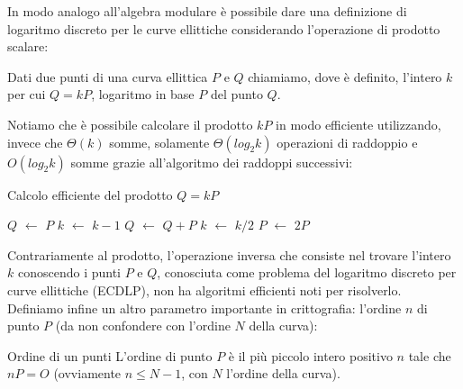 \documentclass{article}
\begin{document}
	In modo analogo all'algebra modulare è possibile dare una definizione di logaritmo discreto per le curve ellittiche
	considerando l'operazione di prodotto scalare:
	
	\begin{defn}
		Dati due punti di una curva ellittica $P$ e $Q$ chiamiamo, dove è definito, l'intero $k$ per cui $Q = kP$,
		logaritmo in base $P$ del punto $Q$.
	\end{defn}
	
	Notiamo che è possibile calcolare il prodotto $kP$ in modo efficiente utilizzando, invece che $\Theta(k)$ somme, solamente $\Theta(log_{2}k)$ operazioni di raddoppio e $O(log_{2}k)$ somme grazie all'algoritmo dei raddoppi successivi:
	
	\newcommand*\DNA{\textsc{dna}}
	
	\newcommand*\Let[2]{\State #1 $\gets$ #2}
	\algrenewcommand{}
	\algrenewcommand{}
	
	
	\makeatletter
	\renewcommand*{\ALG@name}{Algoritmo}
	\makeatother
		
	\begin{algorithm}[H]
		\caption{Calcolo efficiente del prodotto $Q = kP$}
		\begin{algorithmic}[1]
			\Statex
			\Let{$Q$}{$P$}
			\Let{$k$}{$k-1$}
			\Let{$Q$}{$Q + P$}
			\EndIf
			\Let{$k$}{$k / 2$}
			\Let{$P$}{$2P$}
			\EndWhile
			\State {}
			\EndFunction
		\end{algorithmic}
	\end{algorithm}
	
	
	Contrariamente al prodotto, l'operazione inversa che consiste nel trovare l'intero $k$ conoscendo i punti $P$ e $Q$, conosciuta come problema del logaritmo discreto per curve ellittiche (ECDLP), non ha algoritmi efficienti noti per risolverlo.\\
	
	Definiamo infine un altro parametro importante in crittografia: l'ordine $n$ di punto $P$ (da non confondere con l'ordine $N$ della curva):
	
	\begin{defn}{Ordine di un punti}
		L'ordine di punto $P$ è il più piccolo intero positivo $n$ tale che $nP = O$ (ovviamente $n \leq N-1$, con $N$ l'ordine della curva).
	\end{defn}
	
\end{document}
